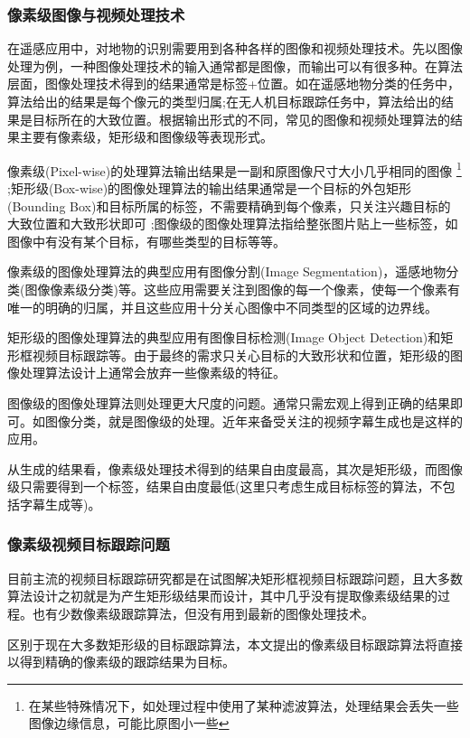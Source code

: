 \subsubsection{像素级图像与视频处理技术}
在遥感应用中，对地物的识别需要用到各种各样的图像和视频处理技术。先以图像处理为例，一种图像处理技术的输入通常都是图像，而输出可以有很多种。在算法层面，图像处理技术得到的结果通常是标签+位置。如在遥感地物分类的任务中，算法给出的结果是每个像元的类型归属;在无人机目标跟踪任务中，算法给出的结果是目标所在的大致位置。根据输出形式的不同，常见的图像和视频处理算法的结果主要有像素级，矩形级和图像级等表现形式。
\par
像素级(Pixel-wise)的处理算法输出结果是一副和原图像尺寸大小几乎相同的图像
\footnote{在某些特殊情况下，如处理过程中使用了某种滤波算法，处理结果会丢失一些图像边缘信息，可能比原图小一些}
;矩形级(Box-wise)的图像处理算法的输出结果通常是一个目标的外包矩形(Bounding Box)和目标所属的标签，不需要精确到每个像素，只关注兴趣目标的大致位置和大致形状即可
;图像级的图像处理算法指给整张图片贴上一些标签，如图像中有没有某个目标，有哪些类型的目标等等。
\par
像素级的图像处理算法的典型应用有图像分割(Image Segmentation)，遥感地物分类(图像像素级分类)等。这些应用需要关注到图像的每一个像素，使每一个像素有唯一的明确的归属，并且这些应用十分关心图像中不同类型的区域的边界线。
\par
矩形级的图像处理算法的典型应用有图像目标检测(Image Object Detection)和矩形框视频目标跟踪等。由于最终的需求只关心目标的大致形状和位置，矩形级的图像处理算法设计上通常会放弃一些像素级的特征。
\par
图像级的图像处理算法则处理更大尺度的问题。通常只需宏观上得到正确的结果即可。如图像分类\supercite{imagenet_cvpr09}，就是图像级的处理。近年来备受关注的视频字幕生成\supercite{aswin2019nlp}也是这样的应用。

\par
从生成的结果看，像素级处理技术得到的结果自由度最高，其次是矩形级，而图像级只需要得到一个标签，结果自由度最低(这里只考虑生成目标标签的算法，不包括字幕生成等)。

\subsubsection{像素级视频目标跟踪问题}
目前主流的视频目标跟踪研究都是在试图解决矩形框视频目标跟踪问题，且大多数算法设计之初就是为产生矩形级结果而设计，其中几乎没有提取像素级结果的过程。也有少数像素级跟踪算法，但没有用到最新的图像处理技术。
\par
区别于现在大多数矩形级的目标跟踪算法，本文提出的像素级目标跟踪算法将直接以得到精确的像素级的跟踪结果为目标。

